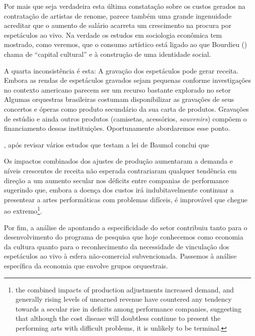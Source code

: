 \documentclass[a4paper, 12pt, openright, oneside, german, french, english, brazil]{abntex2}
\begin{document}
	Por mais que seja verdadeira esta última constatação sobre os custos gerados na contratação de artistas de renome, parece também uma grande ingenuidade acreditar que o aumento de salário acarreta um crescimento na procura por espetáculos ao vivo. Na verdade os estudos em sociologia econômica tem mostrado, como veremos, que o consumo artístico está ligado ao que Bourdieu (\citeyear{bourdieu2011forms,bourdieu2003amor,bourdieu2007distincao}) chama de ``capital cultural'' e à construção de uma identidade social. 
	
	A quarta inconsistência é esta: A gravação dos espetáculos pode gerar receita. Embora as rendas de espetáculos gravados sejam pequenas conforme investigações no contexto americano  parecem ser um recurso bastante explorado no setor Algumas orquestras brasileiras costumam disponibilizar as gravações de seus concertos e óperas como produto secundário da sua carta de produtos. Gravações de estúdio e ainda outros produtos (camisetas, acessórios, \textit{souvenirs}) compõem o financiamento dessas instituições. Oportunamente abordaremos esse ponto.
	
	, após revisar vários estudos que testam a lei de Baumol conclui que
	
	\begin{citacao}
		Os impactos combinados dos ajustes de produção aumentaram a demanda e níveis crescentes de receita não esperada contrariaram qualquer tendência em direção a um aumento secular nos déficits entre companias de performance sugerindo que, embora a doença dos custos irá indubitavelmente continuar a presentear a artes performáticas com problemas difíceis, é improvável que chegue ao extremo\footnote{the combined impacts of production adjustments increased demand, and generally rising levels of unearned revenue have countered any tendency towards a secular rise in deficits among performance companies, suggesting that although the cost disease will doubtless continue to present the performing arts with difficult problems, it is unlikely to be terminal.}. \cite[p. 16]{throsby1994production}
	\end{citacao}
	
	Por fim, a análise de  apontando a especificidade do setor contribuiu tanto para o desenvolvimento do programa de pesquisa que hoje conhecemos como economia da cultura quanto para o reconhecimento da necessidade de vinculação dos espetáculos ao vivo à esfera não-comercial subvencionada. Passemos à análise específica da economia que envolve grupos orquestrais.
	
\end{document}
